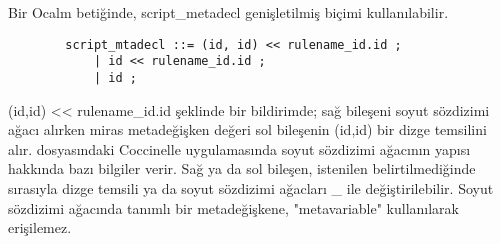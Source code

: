 \documentclass[a4paper,20pt, right=2cm]{article}
\begin{document}
Bir Ocalm betiğinde, script\_metadecl genişletilmiş biçimi kullanılabilir.
\begin{lstlisting}
    	script_mtadecl ::= (id, id) << rulename_id.id ;
			| id << rulename_id.id ;
			| id ;
\end{lstlisting}
(id,id) << rulename\_id.id şeklinde bir bildirimde; sağ bileşeni soyut sözdizimi ağacı alırken miras metadeğişken değeri sol bileşenin (id,id)  bir dizge temsilini alır.  dosyasındaki Coccinelle uygulamasında soyut sözdizimi ağacının yapısı hakkında bazı bilgiler verir. Sağ ya da sol bileşen, istenilen belirtilmediğinde sırasıyla dizge temsili ya da soyut sözdizimi ağacları \_ ile değiştirilebilir.
Soyut sözdizimi ağacında tanımlı bir metadeğişkene, "metavariable" kullanılarak erişilemez.
\end{document}
